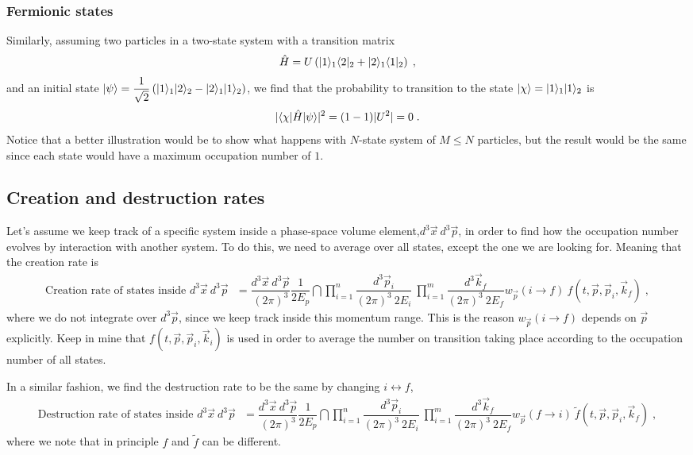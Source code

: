 \documentclass[11pt,a4paper]{article}
\begin{document}
\subsubsection*{Fermionic states}
%
Similarly, assuming two particles in a two-state system with a transition matrix 
%
$$
\hat H = U \left(  | 1 \rangle_1 \langle 2 |_2 + | 2 \rangle_1 \langle 1 |_2 \right)\;,
$$
% 
and an initial state $ | \psi \rangle = \dfrac{1}{\sqrt{2}} \left(   | 1 \rangle_1 | 2 \rangle_2 - | 2 \rangle_1 | 1 \rangle_2   \right)  $, we find that
the probability to transition to the state $| \chi \rangle = | 1 \rangle_1| 1 \rangle_2 $ is
%
\begin{align*}
	|\langle \chi | \hat{H}  | \psi \rangle |^2 = (1-1) |U^2| = 0\;.
\end{align*}
%
Notice that a better illustration would be to show what happens with $N$-state system of $M \leq N$ particles, but the result would be the same since
each state would have a maximum occupation number of $1$.



\subsection*{Creation and destruction rates}
%
Let's assume we keep track of a specific system inside a phase-space volume element,$d^3 \vec{x} \ d^3 \vec{p}$, in order to find how the occupation
number evolves by interaction with another system.  To do this, we need to average over all states, except the one we are looking for. Meaning that the 
creation rate is
%
\begin{align}
	\text{Creation rate of states inside $d^3 \vec{x} \ d^3 \vec{p}$ } =  
	 \dfrac{d^3 \vec{x} \ d^3 \vec{p}}{(2\pi)^3} \dfrac{1}{2E_p} 
	\dint  \prod_{i=1}^{n} \dfrac{d^3 \vec{p}_i}{(2\pi)^3 \ 2E_{i}} \ \prod_{i=1}^{m} \dfrac{d^3\vec{k}_f}{(2\pi)^3 \ 2E_{f}}  w_{\vec{p}}(i\to f) 
	\ f(t,\vec{p}, \vec{p}_i , \vec{k}_f)   \; ,
	\label{eq:creation_rate}
\end{align}
%
where we do not integrate over $d^3 \vec{p}$, since we keep track inside this momentum range. This is the reason $w_{\vec{p}}( i\to f)$ depends on $\vec{p}$
explicitly.  Keep in mine that $f(t,\vec{p}, \vec{p}_i , \vec{k}_i)$ is used in order to average the number on transition taking place according to the 
occupation number of all states.

In a similar fashion, we find the destruction rate to be the same by changing  $i \leftrightarrow f$, \ie 
%
\begin{align}
	\text{Destruction rate of states inside $d^3 \vec{x} \ d^3 \vec{p}$ } =  
	\dfrac{d^3 \vec{x} \ d^3 \vec{p}}{(2\pi)^3} \dfrac{1}{2E_p} 
	\dint  \prod_{i=1}^{n} \dfrac{d^3 \vec{p}_i}{(2\pi)^3 \ 2E_{i}} \ \prod_{i=1}^{m} \dfrac{d^3\vec{k}_f}{(2\pi)^3 \ 2E_{f}}  w_{\vec{p}}(f \to i) 
	\ \tilde{f}(t,\vec{p}, \vec{p}_i , \vec{k}_f)   \; ,
	\label{eq:destruction_rate}
\end{align}
%
where we note that in principle $f$ and $\tilde{f}$ can be different. 
\end{document}
